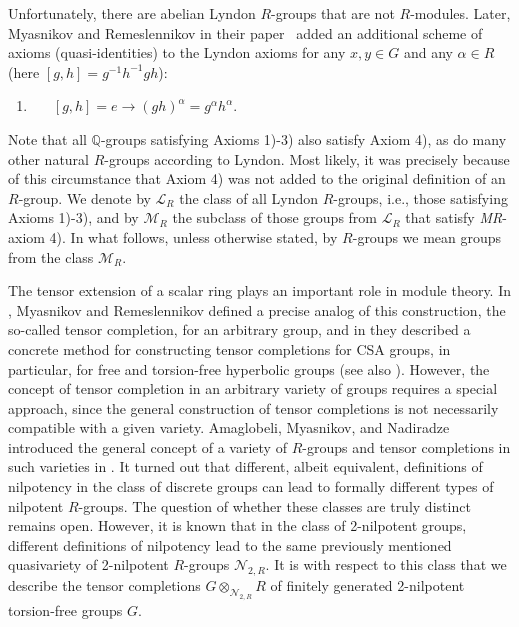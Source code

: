 \documentclass[11pt]{article}
\def\N{{\mathbb N}}
\def\N{{\mathcal{N}}}
\theoremstyle{definition}
\begin{document}
Unfortunately, there are abelian Lyndon $R$-groups that are not $R$-modules. Later, Myasnikov and Remeslennikov in their paper~\cite{2} added an additional scheme of axioms (quasi-identities) to the Lyndon axioms for any $x,y \in G$ and any $\alpha \in R$ (here $[g,h] = g^{-1}h^{-1}gh$):

\begin{enumerate} \label{eq:4}
\item [4)]  \ \ \ $[g,h]=e\longrightarrow (gh)^{\alpha}=g^{\alpha}h^{\alpha}$.
\end{enumerate}

Note that all $\mathbb{Q}$-groups satisfying Axioms 1)-3) also satisfy Axiom 4), as do many other natural $R$-groups according to Lyndon. Most likely, it was precisely because of this circumstance that Axiom 4) was not added to the original definition of an $R$-group. We denote by $\mathcal{L}_{R}$ the class of all Lyndon $R$-groups, i.e., those satisfying Axioms 1)-3), and by $\mathcal{M}_{R}$ the subclass of those groups from $\mathcal{L}_{R}$ that satisfy \emph{MR}-axiom 4). In what follows, unless otherwise stated, by $R$-groups we mean groups from the class $\mathcal{M}_{R}$.

The tensor extension of a scalar ring plays an important role in module theory.
In \cite{2}, Myasnikov and Remeslennikov defined a precise analog of this construction, the so-called tensor completion, for an arbitrary group, and in \cite{6} they described a concrete method for constructing tensor completions for CSA groups, in particular, for free and torsion-free hyperbolic groups (see also \cite{BMR1}). However, the concept of tensor completion in an arbitrary variety of groups requires a special approach, since the general construction of tensor completions is not necessarily compatible with a given variety. Amaglobeli, Myasnikov, and Nadiradze introduced the general concept of a variety of $R$-groups and tensor completions in such varieties in \cite{AMN, 10}. It turned out that different, albeit equivalent, definitions of nilpotency in the class of discrete groups can lead to formally different types of nilpotent $R$-groups. The question of whether these classes are truly distinct remains open. However, it is known \cite{AMN} that in the class of 2-nilpotent groups, different definitions of nilpotency lead to the same previously mentioned quasivariety of 2-nilpotent $R$-groups $\N_{2,R}$. It is with respect to this class that we describe the tensor completions $G \otimes_{\N_{2,R}} R$ of finitely generated 2-nilpotent torsion-free groups $G$.
\end{document}
